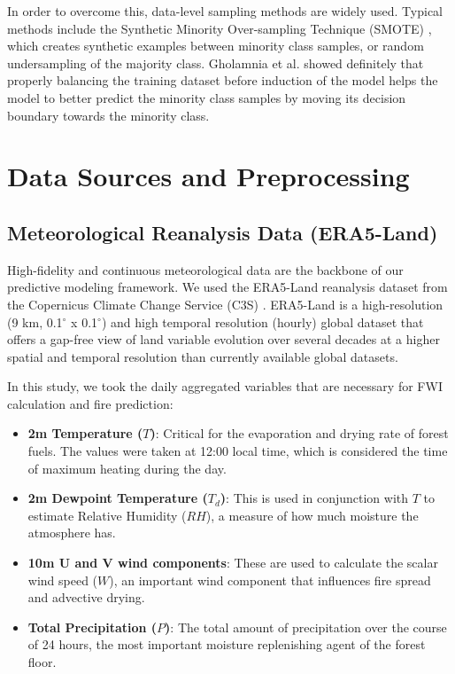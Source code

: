 \documentclass[journal, 10pt, twocolumn]{IEEEtran}
\begin{document}
In order to overcome this, data-level sampling methods are widely used. Typical methods include the Synthetic Minority Over-sampling Technique (SMOTE) \cite{b34}, which creates synthetic examples between minority class samples, or random undersampling of the majority class. Gholamnia et al. \cite{b35} showed definitely that properly balancing the training dataset before induction of the model helps the model to better predict the minority class samples by moving its decision boundary towards the minority class.

\section{Data Sources and Preprocessing}

\subsection{Meteorological Reanalysis Data (ERA5-Land)}
High-fidelity and continuous meteorological data are the backbone of our predictive modeling framework. We used the ERA5-Land reanalysis dataset from the Copernicus Climate Change Service (C3S) \cite{b36}. ERA5-Land is a high-resolution (9 km, 0.1$^\circ$ x 0.1$^\circ$) and high temporal resolution (hourly) global dataset that offers a gap-free view of land variable evolution over several decades at a higher spatial and temporal resolution than currently available global datasets.

In this study, we took the daily aggregated variables that are necessary for FWI calculation and fire prediction:

\begin{itemize}
    \item \textbf{2m Temperature ($T$)}: Critical for the evaporation and drying rate of forest fuels. The values were taken at 12:00 local time, which is considered the time of maximum heating during the day.

    \item \textbf{2m Dewpoint Temperature ($T_d$)}: This is used in conjunction with $T$ to estimate Relative Humidity ($RH$), a measure of how much moisture the atmosphere has.

    \item \textbf{10m U and V wind components}: These are used to calculate the scalar wind speed ($W$), an important wind component that influences fire spread and advective drying.

    \item \textbf{Total Precipitation ($P$)}: The total amount of precipitation over the course of 24 hours, the most important moisture replenishing agent of the forest floor.
\end{itemize}
\end{document}
